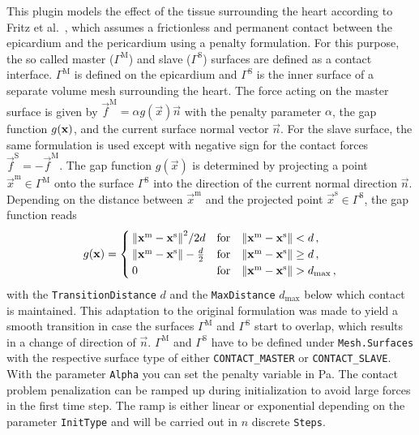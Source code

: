This plugin models the effect of the tissue surrounding the heart according to Fritz et al.~\cite{fritz13a}, which assumes a frictionless and permanent contact between the epicardium and the pericardium using a penalty formulation.
For this purpose, the so called master ($\Gamma^\text{M}$) and slave ($\Gamma^\text{S}$) surfaces are defined as a contact interface.
$\Gamma^\text{M}$ is defined on the epicardium and $\Gamma^\text{S}$ is the inner surface of a separate volume mesh surrounding the heart.
The force acting on the master surface is given by $\vec f^\mathrm{M} = \alpha g(\vec x) \vec n$ with the penalty parameter $\alpha$, the gap function $g(\x)$, and the current surface normal vector $\vec n$.
For the slave surface, the same formulation is used except with negative sign for the contact forces $\vec f^\mathrm{S} = -\vec f^\mathrm{M}$.
The gap function $g(\vec x)$ is determined by projecting a point $\vec x^\mathrm{m} \in \Gamma^\text{M}$ onto the surface $\Gamma^\text{S}$ into the direction of the current normal direction $\vec n$.
Depending on the distance between $\vec x^\mathrm{m}$ and the projected point $\vec x^\mathrm{s} \in \Gamma^\text{S}$, the gap function reads
\begin{equation}
    g(\vec x) = 
    \begin{cases}
    \norm{\vec x^\mathrm{m} - \vec x^\mathrm{s}}^2 / 2d &\qq*{for} \norm{\vec x^\mathrm{m} - \vec x^\mathrm{s}} < d \,, \\
    \norm{\vec x^\mathrm{m} - \vec x^\mathrm{s}} - \frac{d}{2} &\qq*{for} \norm{\vec x^\mathrm{m} - \vec x^\mathrm{s}} \geq d \,, \\
    0 &\qq*{for} \norm{\vec x^\mathrm{m} - \vec x^\mathrm{s}} > d_\mathrm{max} \,,
    \end{cases}
\end{equation}
with the \verb|TransitionDistance| $d$ and the \verb|MaxDistance| $d_\mathrm{max}$ below which contact is maintained.
This adaptation to the original formulation was made to yield a smooth transition in case the surfaces $\Gamma^\text{M}$ and $\Gamma^\text{S}$ start to overlap, which results in a change of direction of $\vec n$.
$\Gamma^\text{M}$ and $\Gamma^\text{S}$ have to be defined under \verb|Mesh.Surfaces| with the respective surface type of either \verb|CONTACT_MASTER| or \verb|CONTACT_SLAVE|.
With the parameter \verb|Alpha| you can set the penalty variable in \si{Pa}.
The contact problem penalization can be ramped up during initialization to avoid large forces in the first time step.
The ramp is either linear or exponential depending on the parameter \verb|InitType| and will be carried out in $n$ discrete \verb|Steps|.

